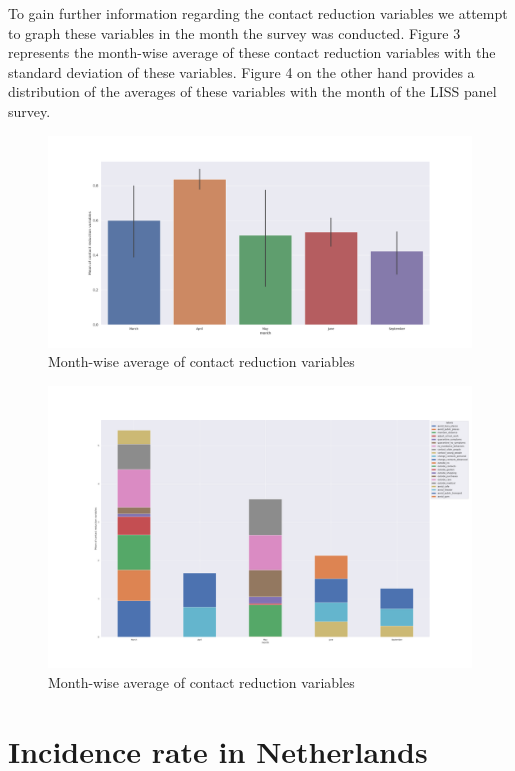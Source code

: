 \documentclass[11pt, a4paper, leqno]{article}
\begin{document}
\newpage

To gain further information regarding the contact reduction variables we attempt to graph these
variables in the month the survey was conducted. Figure 3 represents the month-wise average of these contact reduction variables with the standard deviation of these variables. Figure 4 on the other hand provides a distribution of the averages of these variables with the month of the LISS panel survey. 


\begin{figure}[H]
    \caption{Month-wise average of contact reduction variables}
    \includegraphics[width=\textwidth]{../../bld/figures/monthwise_mean_variables}
\end{figure}


\begin{figure}[H]
    \caption{Month-wise average of contact reduction variables}
    \includegraphics[width=\textwidth]{../../bld/figures/stackedbar}
\end{figure}


\newpage
\section{Incidence rate in Netherlands}
\end{document}
